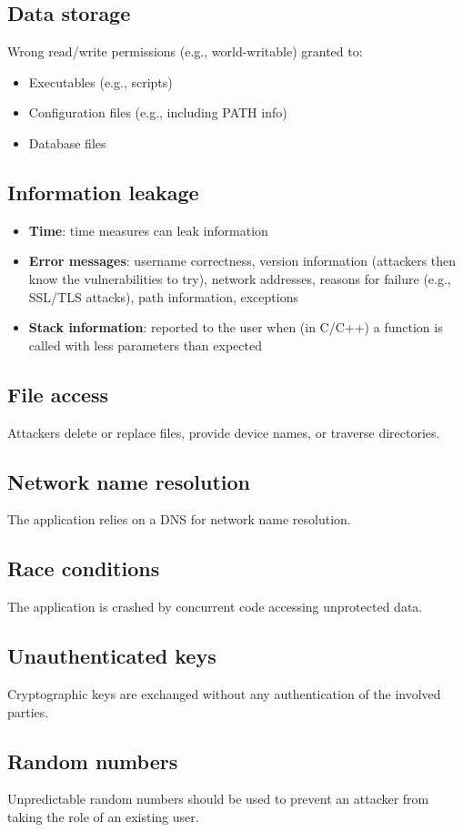 \documentclass[a4paper, 10pt, titlepage]{article}
\begin{document}
\subsection*{Data storage}
Wrong read/write permissions (e.g., world-writable) granted
to:
\begin{itemize}
\item Executables (e.g., scripts)
\item Configuration files (e.g., including PATH info)
\item Database files
\end{itemize}	
\subsection*{Information leakage}
\begin{itemize}
\item \textbf{Time}: time measures can leak information
\item \textbf{Error messages}: username correctness, version information
(attackers then know the vulnerabilities to try), network addresses, reasons for failure (e.g., SSL/TLS attacks), path information, exceptions
\item \textbf{Stack information}: reported to the user when (in C/C++) a function is called with less parameters than expected
\end{itemize}
\subsection*{File access}
Attackers delete or replace files, provide device names, or traverse directories.
\subsection*{Network name resolution}
The application relies on a DNS for network name resolution.
\subsection*{Race conditions}
The application is crashed by concurrent code accessing unprotected data.
\subsection*{Unauthenticated keys}
Cryptographic keys are exchanged without any authentication of the involved parties.
\subsection*{Random numbers}
Unpredictable random numbers should be used to prevent an attacker from taking the role of an existing user.
\end{document}
